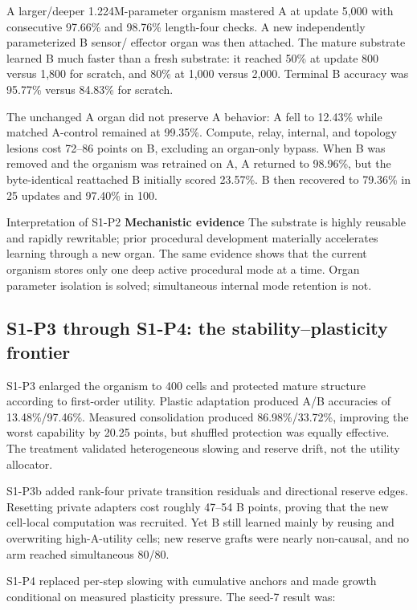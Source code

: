 \documentclass[11pt]{article}
\newcommand{\mechanistic}{\textcolor{DmonBlue}{\textbf{Mechanistic evidence}}}
\begin{document}
A larger/deeper 1.224M-parameter organism mastered A at update 5,000 with consecutive
97.66\% and 98.76\% length-four checks. A new independently parameterized B sensor/
effector organ was then attached. The mature substrate learned B much faster than a
fresh substrate: it reached 50\% at update 800 versus 1,800 for scratch, and 80\% at
1,000 versus 2,000. Terminal B accuracy was 95.77\% versus 84.83\% for scratch.

The unchanged A organ did not preserve A behavior: A fell to 12.43\% while matched
A-control remained at 99.35\%. Compute, relay, internal, and topology lesions cost
72--86 points on B, excluding an organ-only bypass. When B was removed and the organism
was retrained on A, A returned to 98.96\%, but the byte-identical reattached B initially
scored 23.57\%. B then recovered to 79.36\% in 25 updates and 97.40\% in 100.

\begin{claimbox}{Interpretation of S1-P2}
\mechanistic{} The substrate is highly reusable and rapidly rewritable; prior procedural
development materially accelerates learning through a new organ. The same evidence shows
that the current organism stores only one deep active procedural mode at a time. Organ
parameter isolation is solved; simultaneous internal mode retention is not.
\end{claimbox}

\subsection{S1-P3 through S1-P4: the stability--plasticity frontier}

S1-P3 enlarged the organism to 400 cells and protected mature structure according to
first-order utility. Plastic adaptation produced A/B accuracies of 13.48\%/97.46\%.
Measured consolidation produced 86.98\%/33.72\%, improving the worst capability by 20.25 points,
but shuffled protection was equally effective. The treatment validated heterogeneous
slowing and reserve drift, not the utility allocator.

S1-P3b added rank-four private transition residuals and directional reserve edges. Resetting
private adapters cost roughly 47--54 B points, proving that the new cell-local computation
was recruited. Yet B still learned mainly by reusing and overwriting high-A-utility cells;
new reserve grafts were nearly non-causal, and no arm reached simultaneous 80/80.

S1-P4 replaced per-step slowing with cumulative anchors and made growth conditional on
measured plasticity pressure. The seed-7 result was:
\end{document}
